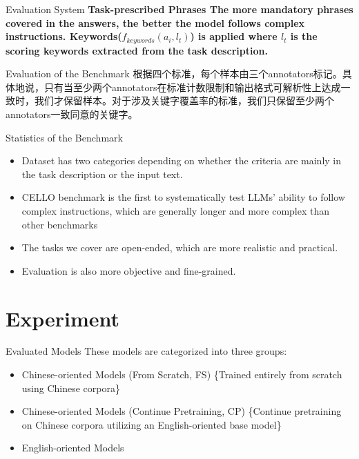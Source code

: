 \documentclass{beamer}
\begin{document}
\begin{frame}{Evaluation System}
    \large\bfseries{Task-prescribed Phrases}
    \newline
    \normalfont
    The more mandatory phrases covered in the answers, the better the model follows complex instructions.
    \newline
    \newline
    Keywords($f_{keywords}(a_i, l_t)$) is applied where $l_t$ is the scoring keywords extracted from the task description.
\end{frame}

\begin{frame}{Evaluation of the Benchmark}
    根据四个标准，每个样本由三个annotators标记。具体地说，只有当至少两个annotators在标准计数限制和输出格式可解析性上达成一致时，我们才保留样本。对于涉及关键字覆盖率的标准，我们只保留至少两个annotators一致同意的关键字。
\end{frame}

\begin{frame}{Statistics of the Benchmark}
    \begin{itemize}
        \item {Dataset has two categories depending on whether the criteria are mainly in the task description or the input text.}
        \item {CELLO benchmark is the first to systematically test LLMs' ability to follow complex instructions, which are generally longer and more complex than other benchmarks}
        \item {The tasks we cover are open-ended, which are more realistic and practical.}
        \item {Evaluation is also more objective and fine-grained.}
    \end{itemize}
\end{frame}

\section{Experiment}

\begin{frame}{Evaluated Models}
    These models are categorized into three groups:
    \begin{itemize}
        \item {Chinese-oriented Models (From Scratch, FS) \{Trained entirely from scratch using Chinese corpora\}}
        \item {Chinese-oriented Models (Continue Pretraining, CP) \{Continue pretraining on Chinese corpora utilizing an English-oriented base model\}}
        \item {English-oriented Models}
    \end{itemize}
\end{frame}
\end{document}
